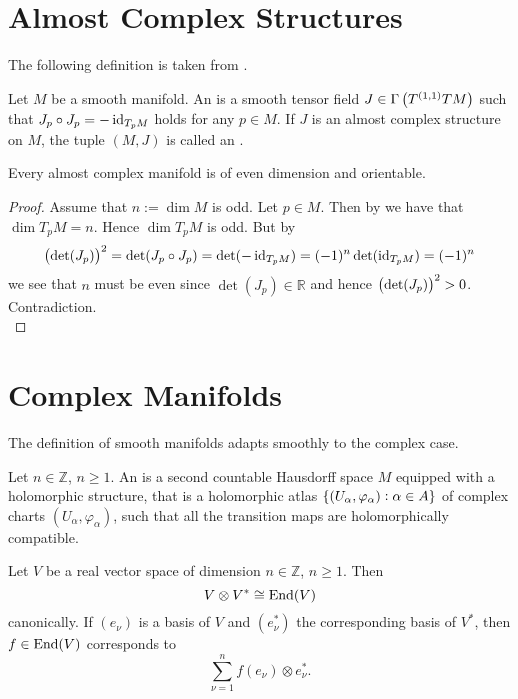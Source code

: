 \section{Almost Complex Structures}
The following definition is taken from \cite[86]{cannas:symplectic_geometry:2008}.
\begin{definition}
Let $M$ be a smooth manifold. An  is a smooth tensor field $J \in \Gamma\del[1]{T^{(1,1)}TM}$ such that $J_p \circ J_p = -\operatorname{id}_{T_pM}$ holds for any $p \in M$. If $J$ is an almost complex structure on $M$, the tuple $(M,J)$ is called an .
\end{definition}

\begin{proposition}
Every almost complex manifold is of even dimension and orientable.
\end{proposition}

\begin{proof}
Assume that $n := \dim M$ is odd. Let $p \in M$. Then by \cite[57]{lee:smooth_manifolds:2013} we have that $\dim T_p M = n$. Hence $\dim T_pM$ is odd. But by
\begin{equation*}
\del[1]{\det(J_p)}^2 = \det(J_p \circ J_p) = \det(-\id_{T_pM}) = (-1)^n \det(\id_{T_pM}) = (-1)^n
\end{equation*}
\noindent we see that $n$ must be even since $\det(J_p) \in \mathbb{R}$ and hence $\del[1]{\det(J_p)}^2 > 0$. Contradiction.\\
\end{proof}

\section{Complex Manifolds}
The definition of smooth manifolds adapts smoothly to the complex case.

\begin{definition}
Let $n \in \mathbb{Z}$, $n \geq 1$. An  is a second countable Hausdorff space $M$ equipped with a holomorphic structure, that is a holomorphic atlas $\cbr[0]{(U_\alpha, \varphi_\alpha) : \alpha \in A}$ of complex charts $(U_\alpha,\varphi_\alpha)$, such that all the transition maps are holomorphically compatible.
\end{definition}

\begin{lemma}
Let $V$ be a real vector space of dimension $n \in \mathbb{Z}$, $n \geq 1$. Then
\begin{equation}
V \otimes V^* \cong \operatorname{End}(V)
\end{equation}
\noindent canonically. If $(e_\nu)$ is a basis of $V$ and $(e_\nu^*)$ the corresponding basis of $V^*$, then $f \in \operatorname{End}(V)$ corresponds to
\begin{equation}
\sum_{\nu = 1}^n f(e_\nu) \otimes e_\nu^*.
\end{equation}
\label{lem:corr}
\end{lemma}

